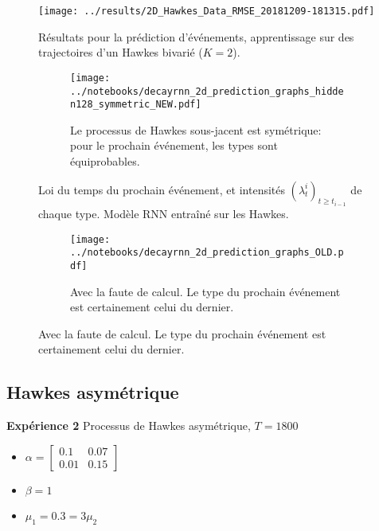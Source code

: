 \documentclass[../main.tex]{subfiles}
\begin{document}
\begin{frame}
\begin{figure}
	\centering
	\texttt{[image: ../results/2D\_Hawkes\_Data\_RMSE\_20181209-181315.pdf]}
	\caption{Résultats pour la prédiction d'événements, apprentissage sur des trajectoires d'un Hawkes bivarié ($K=2$).}
\end{figure}
\end{frame}

\begin{frame}
\begin{figure}
\begin{subfigure}{\linewidth}
	\texttt{[image: ../notebooks/decayrnn\_2d\_prediction\_graphs\_hidden128\_symmetric\_NEW.pdf]}
	\caption{Le processus de Hawkes sous-jacent est symétrique: pour le prochain événement, les types sont équiprobables.}
\end{subfigure}
	\caption{Loi du temps du prochain événement, et intensités $(\lambda^i_t)_{t\geq t_{i-1}}$ de chaque type. Modèle RNN entraîné sur les Hawkes.}
\end{figure}
\end{frame}

\begin{frame}
\begin{figure}\ContinuedFloat
\begin{subfigure}{\linewidth}
	\texttt{[image: ../notebooks/decayrnn\_2d\_prediction\_graphs\_OLD.pdf]}
	\caption{Avec la faute de calcul. Le type du prochain événement est certainement celui du dernier.}
\end{subfigure}
\end{figure}
\end{frame}

\subsection{Hawkes asymétrique}

\begin{frame}
\textbf{Expérience 2} Processus de Hawkes asymétrique, $T = 1800$
\begin{itemize}
	\item $\alpha = \begin{bmatrix}0.1 & 0.07\\ 0.01 & 0.15\end{bmatrix}$
	\item $\beta = 1$
	\item $\mu_1 = \num{0.3} = 3\mu_2$
\end{itemize}
\end{frame}
\end{document}
